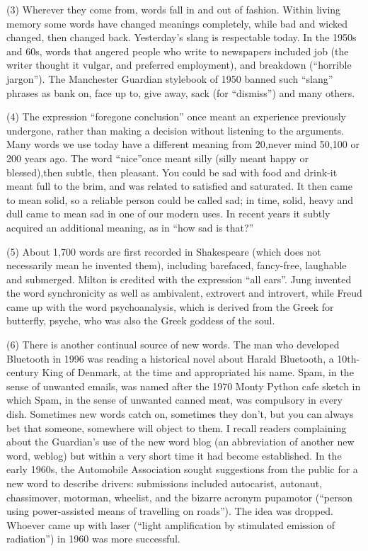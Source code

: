 \documentclass[UTF8,11pt]{ctexart}
\begin{document}
(3) Wherever they come from, words fall in and out of fashion. Within living memory some words have changed meanings completely, while bad and wicked changed, then changed back. Yesterday’s slang is respectable today. In the 1950s and 60s, words that angered people who write to newspapers included job (the writer thought it vulgar, and preferred employment), and breakdown (“horrible jargon”). The Manchester Guardian stylebook of 1950 banned such “slang” phrases as bank on, face up to, give away, sack (for “dismiss”) and many others.


(4) The expression “foregone conclusion” once meant an experience previously undergone, rather than making a decision without listening to the arguments. Many words we use today have a different meaning from 20,never mind 50,100 or 200 years ago. The word “nice”once meant silly (silly meant happy or blessed),then subtle, then pleasant. You could be sad with food and drink-it meant full to the brim, and was related to satisfied and saturated. It then came to mean solid, so a reliable person could be called sad; in time, solid, heavy and dull came to mean sad in one of our modern uses. In recent years it subtly acquired an additional meaning, as in “how sad is that?”


(5) About 1,700 words are first recorded in Shakespeare (which does not necessarily mean he invented them), including barefaced, fancy-free, laughable and submerged. Milton is credited with the expression “all ears”. Jung invented the word synchronicity as well as ambivalent, extrovert and introvert, while Freud came up with the word psychoanalysis, which is derived from the Greek for butterfly, psyche, who was also the Greek goddess of the soul.


(6) There is another continual source of new words. The man who developed Bluetooth in 1996 was reading a historical novel about Harald Bluetooth, a 10th-century King of Denmark, at the time and appropriated his name. Spam, in the sense of unwanted emails, was named after the 1970 Monty Python cafe sketch in which Spam, in the sense of unwanted canned meat, was compulsory in every dish. Sometimes new words catch on, sometimes they don’t, but you can always bet that someone, somewhere will object to them. I recall readers complaining about the Guardian’s use of the new word blog (an abbreviation of another new word, weblog) but within a very short time it had become established. In the early 1960s, the Automobile Association sought suggestions from the public for a new word to describe drivers: submissions included autocarist, autonaut, chassimover, motorman, wheelist, and the bizarre acronym pupamotor (“person using power-assisted means of travelling on roads”). The idea was dropped. Whoever came up with laser (“light amplification by stimulated emission of radiation”) in 1960 was more successful.
\end{document}
